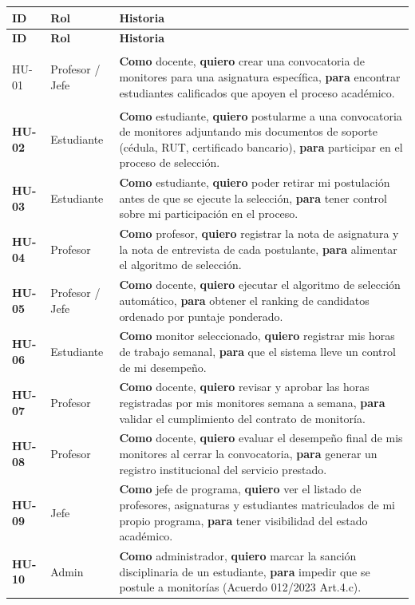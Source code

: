 \documentclass[12pt,a4paper]{article}
\begin{document}
\begin{longtable}{>{\bfseries}p{1.2cm} p{3cm} p{9cm}}
  \toprule
  \textbf{ID} & \textbf{Rol} & \textbf{Historia} \\
  \midrule
  \endfirsthead
  \toprule \textbf{ID} & \textbf{Rol} & \textbf{Historia} \\ \midrule
  \endhead

  HU-01 & Profesor / Jefe & \textbf{Como} docente, \textbf{quiero} crear una convocatoria de monitores para una asignatura específica, \textbf{para} encontrar estudiantes calificados que apoyen el proceso académico. \\[4pt]

  HU-02 & Estudiante & \textbf{Como} estudiante, \textbf{quiero} postularme a una convocatoria de monitores adjuntando mis documentos de soporte (cédula, RUT, certificado bancario), \textbf{para} participar en el proceso de selección. \\[4pt]

  HU-03 & Estudiante & \textbf{Como} estudiante, \textbf{quiero} poder retirar mi postulación antes de que se ejecute la selección, \textbf{para} tener control sobre mi participación en el proceso. \\[4pt]

  HU-04 & Profesor & \textbf{Como} profesor, \textbf{quiero} registrar la nota de asignatura y la nota de entrevista de cada postulante, \textbf{para} alimentar el algoritmo de selección. \\[4pt]

  HU-05 & Profesor / Jefe & \textbf{Como} docente, \textbf{quiero} ejecutar el algoritmo de selección automático, \textbf{para} obtener el ranking de candidatos ordenado por puntaje ponderado. \\[4pt]

  HU-06 & Estudiante & \textbf{Como} monitor seleccionado, \textbf{quiero} registrar mis horas de trabajo semanal, \textbf{para} que el sistema lleve un control de mi desempeño. \\[4pt]

  HU-07 & Profesor & \textbf{Como} docente, \textbf{quiero} revisar y aprobar las horas registradas por mis monitores semana a semana, \textbf{para} validar el cumplimiento del contrato de monitoría. \\[4pt]

  HU-08 & Profesor & \textbf{Como} docente, \textbf{quiero} evaluar el desempeño final de mis monitores al cerrar la convocatoria, \textbf{para} generar un registro institucional del servicio prestado. \\[4pt]

  HU-09 & Jefe & \textbf{Como} jefe de programa, \textbf{quiero} ver el listado de profesores, asignaturas y estudiantes matriculados de mi propio programa, \textbf{para} tener visibilidad del estado académico. \\[4pt]

  HU-10 & Admin & \textbf{Como} administrador, \textbf{quiero} marcar la sanción disciplinaria de un estudiante, \textbf{para} impedir que se postule a monitorías (Acuerdo 012/2023 Art.4.c). \\

  \bottomrule
\end{longtable}
\end{document}
